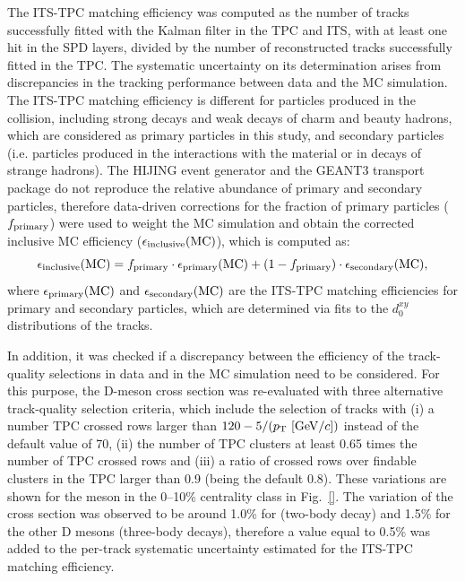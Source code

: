 The ITS-TPC matching efficiency was computed as the number of tracks successfully fitted with the Kalman filter in the TPC and ITS, with at least one hit in the SPD layers, divided by the number of reconstructed tracks successfully fitted in the TPC. The systematic uncertainty on its determination arises from discrepancies in the tracking performance between data and the MC simulation. The ITS-TPC matching efficiency is different for particles produced in the collision, including strong decays and weak decays of charm and beauty hadrons, which are considered as primary particles in this study, and secondary particles (i.e. particles produced in the interactions with the material or in decays of strange hadrons). The HIJING event generator and the GEANT3 transport package do not reproduce the relative abundance of primary and secondary particles, therefore data-driven corrections for the fraction of primary particles ($f_{\rm primary}$) were used to weight the MC simulation and obtain the corrected inclusive MC efficiency ($\epsilon_{\rm inclusive}({\rm MC})$), which is computed as:
\begin{equation}
	\epsilon_{\rm inclusive}({\rm MC}) = f_{\rm primary}\cdot\epsilon_{\rm primary}({\rm MC})+(1-f_{\rm primary})\cdot\epsilon_{\rm secondary}({\rm MC}),
\end{equation}
where $\epsilon_{\rm primary}({\rm MC})$ and $\epsilon_{\rm secondary}({\rm MC})$ are the ITS-TPC matching efficiencies for primary and secondary particles, which are determined via fits to the $d_0^{xy}$ distributions of the tracks. 

In addition, it was checked if a discrepancy between the efficiency of the track-quality selections in data and in the MC simulation need to be considered. For this purpose, the D-meson cross section was re-evaluated with three alternative track-quality selection criteria, which include the selection of tracks with (i) a number TPC crossed rows larger than $120-5/(p_{\rm T}~[{\rm GeV}/c])$ instead of the default value of 70, (ii)  the number of TPC clusters at least 0.65 times the number of TPC crossed rows and (iii) a ratio of crossed rows over findable clusters in the TPC larger than 0.9 (being the default 0.8). These variations are shown for the \Dsubs meson in the 0--10\% centrality class in Fig.~\ref{}.
The variation of the cross section was observed to be around 1.0\% for \Dzero (two-body decay) and 1.5\% for the other D mesons (three-body decays), therefore a value equal to 0.5\% was added to the per-track systematic uncertainty estimated for the ITS-TPC matching efficiency. 

